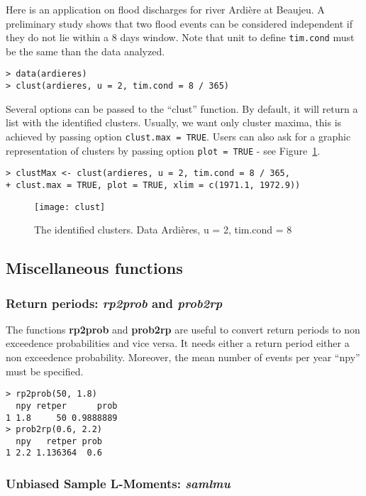 \documentclass[11pt,a4paper]{article}
\numberwithin{equation}{section}
\theoremstyle{definition}
\begin{document}
Here is an application on flood discharges for river Ardi\`ere at
Beaujeu. A preliminary study shows that two flood events can be
considered independent if they do not lie within a 8 days window. Note
that unit to define \verb|tim.cond| must be the same than the data
analyzed. 
\begin{verbatim}
> data(ardieres)
> clust(ardieres, u = 2, tim.cond = 8 / 365)
\end{verbatim}

Several options can be passed to the ``clust'' function. By default,
it will return a list with the identified clusters. Usually, we want
only cluster maxima, this is achieved by passing option
\verb|clust.max = TRUE|. Users can also ask for a graphic
representation of clusters by passing option \verb|plot = TRUE| - see
Figure~\ref{fig:clust}.
\begin{verbatim}
> clustMax <- clust(ardieres, u = 2, tim.cond = 8 / 365,
+ clust.max = TRUE, plot = TRUE, xlim = c(1971.1, 1972.9))
\end{verbatim}
\begin{figure}
  \centering
  \texttt{[image: clust]}
  \caption{The identified clusters. Data Ardi\`eres, u = 2, tim.cond = 8}
  \label{fig:clust}
\end{figure}

\subsection{Miscellaneous functions}
\label{subsec:miscFunc}

\subsubsection{Return periods: \emph{rp2prob} and \emph{prob2rp}}

The functions \textbf{rp2prob} and \textbf{prob2rp} are useful to
convert return periods to non exceedence probabilities and vice
versa. It needs either a return period either a non exceedence
probability. Moreover, the mean number of events per year ``npy'' must
be specified.
\begin{verbatim}
> rp2prob(50, 1.8)
  npy retper      prob
1 1.8     50 0.9888889
> prob2rp(0.6, 2.2)
  npy   retper prob
1 2.2 1.136364  0.6
\end{verbatim}

\subsubsection{Unbiased Sample L-Moments: \emph{samlmu}}
\end{document}
